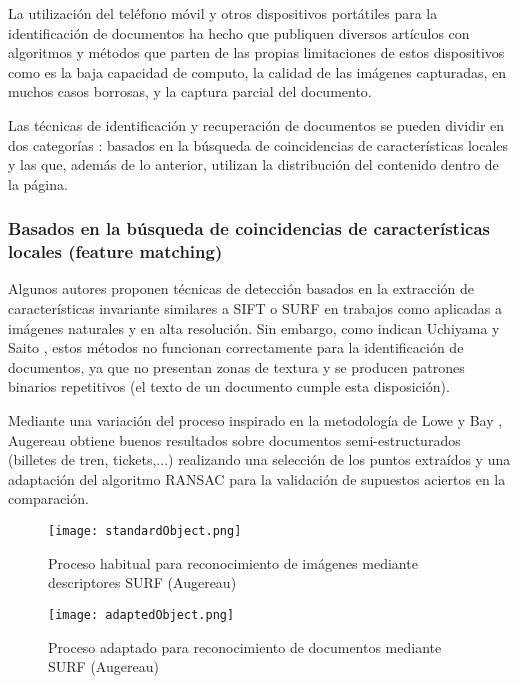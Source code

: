 La utilización del teléfono móvil y otros dispositivos portátiles para la identificación de documentos ha hecho que publiquen diversos artículos con algoritmos y métodos que parten de las propias limitaciones de estos dispositivos como es la baja capacidad de computo, la calidad de las imágenes capturadas, en muchos casos borrosas, y la captura parcial del documento.

Las técnicas de identificación y recuperación de documentos se pueden dividir en dos categorías \cite{Peng}: basados en la búsqueda de coincidencias de características locales y las que, además de lo anterior, utilizan la distribución del contenido dentro de la página.

\subsubsection{Basados en la búsqueda de coincidencias de características locales (feature matching)}
Algunos autores proponen técnicas de detección basados en la extracción de características invariante similares a SIFT \cite{Lowe} o SURF \cite{Bay} en trabajos como \cite{Yang} \cite{Psyllos} \cite{Brown} aplicadas a imágenes naturales y en alta resolución. Sin embargo, como indican Uchiyama y Saito \cite{Uchiyama}, estos métodos no funcionan correctamente para la identificación de documentos, ya que no presentan zonas de textura y se producen patrones binarios repetitivos (el texto de un documento cumple esta disposición). 

Mediante una variación del proceso inspirado en la metodología de Lowe \cite{Lowe} y Bay \cite{Bay}, Augereau \cite{Augereau} obtiene buenos resultados sobre documentos semi-estructurados (billetes de tren, tickets,...) realizando una selección de los puntos extraídos y una adaptación del algoritmo RANSAC para la validación de supuestos aciertos en la comparación.

\begin{figure}
  \centering
  \texttt{[image: standardObject.png]}
  \caption{Proceso habitual para reconocimiento de imágenes mediante descriptores SURF (Augereau)}
  \label{fig:extraccionSt}
\end{figure}

\begin{figure}
  \centering
  \texttt{[image: adaptedObject.png]}
  \caption{Proceso adaptado para reconocimiento de documentos mediante SURF (Augereau)}
  \label{fig:extraccionAd}
\end{figure}

